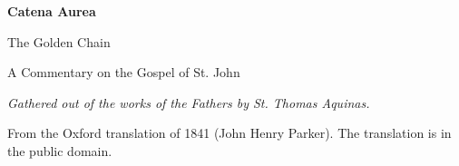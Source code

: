 \documentclass[11pt,letterpaper]{article}
\begin{document}
\color{ink}

\begin{titlepage}
\centering
\vspace*{4em}
{\LARGE\bfseries\color{heading} Catena Aurea\par}
\vspace{1em}
{\large The Golden Chain\par}
\vspace{2em}
{\Large\color{subhead} A Commentary on the Gospel of St. John\par}
\vspace{2.5em}
{\itshape\color{subhead} Gathered out of the works of the Fathers by
St. Thomas Aquinas.\par}
\vfill
{\small From the Oxford translation of 1841 (John Henry Parker). The
translation is in the public domain.\par}
\vspace{2em}
\end{titlepage}

\tableofcontents


\end{document}
